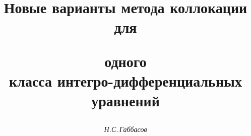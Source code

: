

 




 


\newcommand{\PF}{\mathrm{P.F.}\;} 


\newcommand{\Lip}{\operatorname{Lip}} 


\newcommand{\tts}[1]{} 


 




\setcounter{page}{24} 












 


\author{\it Н.С.\,Габбасов} 




\title{Новые варианты метода коллокации для  


одного\\ класса интегро-дифференциальных уравнений} 


 


\date{} 




\pagestyle{plain} %


 




\maketitle 


